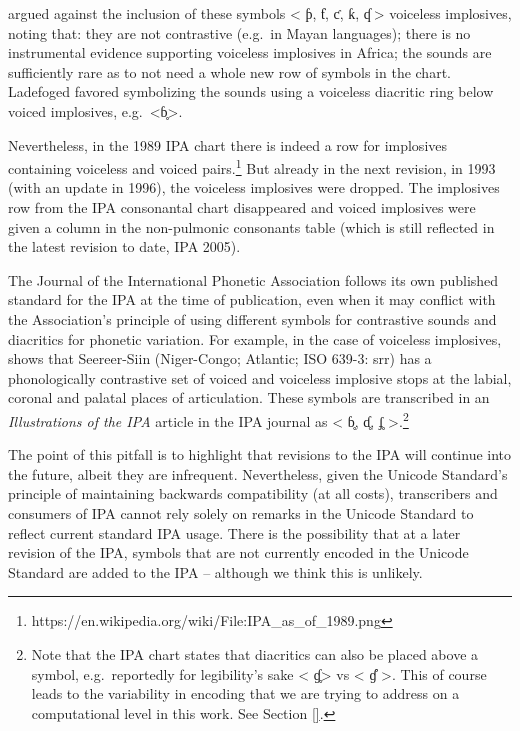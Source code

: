 \cite{Ladefoged1990a} argued against the inclusion of these symbols < ƥ, ƭ, ƈ, ƙ, ʠ > 
voiceless implosives, noting that: they are not contrastive (e.g.\ in Mayan 
languages); there is no instrumental evidence supporting voiceless implosives 
in Africa; the sounds are sufficiently rare as to not need a whole new row 
of symbols in the chart. Ladefoged favored symbolizing the sounds using a 
voiceless diacritic ring below voiced implosives, e.g.\ <ɓ̥>.

Nevertheless, in the 1989 IPA chart there is indeed a row for implosives 
containing voiceless and voiced pairs.\footnote{https://en.wikipedia.org/wiki/File:IPA\_as\_of\_1989.png} 
But already in the next revision, in 1993 (with an update in 1996), the voiceless 
implosives were dropped. The implosives row from the IPA consonantal chart 
disappeared and voiced implosives were given a column in the non-pulmonic 
consonants table (which is still reflected in the latest revision to date, IPA 2005).

The Journal of the International Phonetic Association follows its own 
published standard for the IPA at the time of publication, even when it 
may conflict with the Association's principle of using different symbols 
for contrastive sounds and diacritics for phonetic variation. For example, 
in the case of voiceless implosives, \cite{McLaughlin2005} shows that 
Seereer-Siin (Niger-Congo; Atlantic; ISO 639-3: srr) has a phonologically 
contrastive set of voiced and voiceless implosive stops at the labial, 
coronal and palatal places of articulation. These symbols are transcribed 
in an \textit{Illustrations of the IPA} article in the IPA journal as 
< ɓ̥, ɗ̥, ʄ̥ >.\footnote{Note that the IPA chart states that diacritics 
can also be placed above a symbol, e.g.\ reportedly for legibility's 
sake < ɠ̥> vs < ɠ̊ >. This of course leads to the variability in encoding 
that we are trying to address on a computational level in this work. 
See Section \ref{}.}

The point of this pitfall is to highlight that revisions to the IPA will 
continue into the future, albeit they are infrequent. Nevertheless, 
given the Unicode Standard's principle of maintaining backwards compatibility 
(at all costs), transcribers and consumers of IPA cannot rely solely on 
remarks in the Unicode Standard to reflect current standard IPA usage. 
There is the possibility that at a later revision of the IPA, symbols that 
are not currently encoded in the Unicode Standard are added to the IPA -- 
although we think this is unlikely. 


